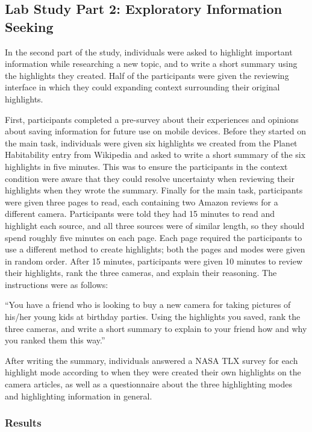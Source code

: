 \subsection{Lab Study Part 2: Exploratory Information Seeking}

In the second part of the study, individuals were asked to highlight important information while researching a new topic, and to write a short summary using the highlights they created. Half of the participants were given the reviewing interface in which they could expanding context surrounding their original highlights. 

First, participants completed a pre-survey about their experiences and opinions about saving information for future use on mobile devices. Before they started on the main task, individuals were given six highlights we created from the Planet Habitability entry from Wikipedia and asked to write a short summary of the six highlights in five minutes. This was to ensure the participants in the context condition were aware that they could resolve uncertainty when reviewing their highlights when they wrote the summary. Finally for the main task, participants were given three pages to read, each containing two Amazon reviews for a different camera. Participants were told they had 15 minutes to read and highlight each source, and all three sources were of similar length, so they should spend roughly five minutes on each page. Each page required the participants to use a different method to create highlights; both the pages and modes were given in random order. After 15 minutes, participants were given 10 minutes to review their highlights, rank the three cameras, and explain their reasoning. The instructions were as follows: 

``You have a friend who is looking to buy a new camera for taking pictures of his/her young kids at birthday parties. Using the highlights you saved, rank the three cameras, and write a short summary to explain to your friend how and why you ranked them this way.''


After writing the summary, individuals answered a NASA TLX survey for each highlight mode according to when they were created their own highlights on the camera articles, as well as a questionnaire about the three highlighting modes and highlighting information in general.

\subsubsection{Results}

